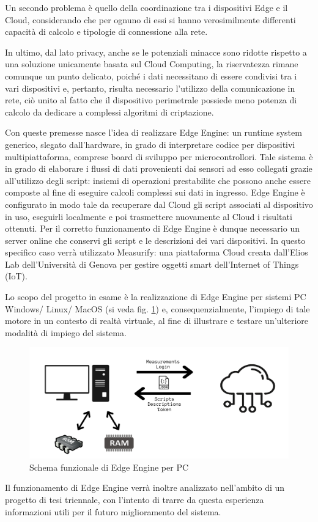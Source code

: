 Un secondo problema è quello della coordinazione tra i dispositivi Edge e il Cloud, considerando che per ognuno di essi si hanno verosimilmente differenti capacità di calcolo e tipologie di connessione alla rete.

In ultimo, dal lato privacy, anche se le potenziali minacce sono ridotte rispetto a una soluzione unicamente basata sul Cloud Computing, la riservatezza rimane comunque un punto delicato, poiché i dati necessitano di essere condivisi tra i vari dispositivi e, pertanto, risulta necessario l'utilizzo della comunicazione in rete, ciò unito al fatto che il dispositivo perimetrale possiede meno potenza di calcolo da dedicare a complessi algoritmi di criptazione.

Con queste premesse nasce l'idea di realizzare Edge Engine: un runtime system generico, slegato dall'hardware, in grado di interpretare codice per dispositivi multipiattaforma, comprese board di sviluppo per microcontrollori. Tale sistema è in grado di elaborare i flussi di dati provenienti dai sensori ad esso collegati grazie all'utilizzo degli script: insiemi di operazioni prestabilite che possono anche essere composte al fine di eseguire calcoli complessi sui dati in ingresso. Edge Engine è configurato in modo tale da recuperare dal Cloud gli script associati al dispositivo in uso, eseguirli localmente e poi trasmettere nuovamente al Cloud i risultati ottenuti. Per il corretto funzionamento di Edge Engine è dunque necessario un server online che conservi gli script e le descrizioni dei vari dispositivi. In questo specifico caso verrà utilizzato Measurify: una piattaforma Cloud creata dall'Elios Lab dell'Università di Genova per gestire oggetti smart dell'Internet of Things (IoT).

Lo scopo del progetto in esame è la realizzazione di Edge Engine per sistemi PC Windows/ Linux/ MacOS (si veda fig. \ref{edgine}) e, consequenzialmente, l'impiego di tale motore in un contesto di realtà virtuale, al fine di illustrare e testare un'ulteriore modalità di impiego del sistema.

\begin{figure}[H]
	\centering
	\includegraphics[width=\linewidth]{pics/edgine}
	\caption{Schema funzionale di Edge Engine per PC}
	\label{edgine}
\end{figure}

Il funzionamento di Edge Engine verrà inoltre analizzato nell'ambito di un progetto di tesi triennale, con l'intento di trarre da questa esperienza informazioni utili per il futuro miglioramento del sistema.